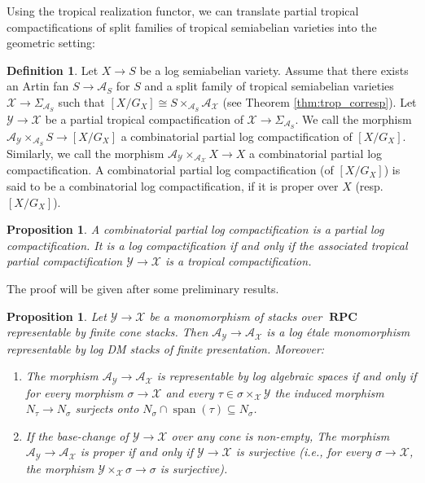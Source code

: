 \documentclass[11pt]{amsart}
\newtheorem{proposition}[theorem]{Proposition}
\theoremstyle{definition}
\newtheorem{definition}[theorem]{Definition}
\theoremstyle{remark}
\DeclareMathOperator{\Span}{span}
\DeclareMathOperator{\RPC}{\mathbf{RPC}}
\begin{document}
Using the tropical realization functor, we can translate partial tropical compactifications of split families of tropical semiabelian varieties
into the geometric setting:

\begin{definition}
	\label{def:combinat_prt_cpt}
	Let $X\to S$ be a log semiabelian variety. Assume that there exists an Artin fan $S\to \mathcal{A}_S$ for $S$ and
	a split family of tropical semiabelian varieties $\mathcal{X}\to \Sigma_{\mathcal{A}_S}$ such that
	$[X/G_X]\cong S\times_{\mathcal{A}_S}\mathcal{A}_{\mathcal{X}}$ (see Theorem \ref{thm:trop_corresp}). Let $\mathcal{Y}\to \mathcal{X}$
	be a partial tropical compactification of $\mathcal{X}\to \Sigma_{\mathcal{A}_S}$. We call the morphism
	$\mathcal{A}_{\mathcal{Y}}\times_{\mathcal{A}_{S}}S\to [X/G_X]$ a combinatorial partial log compactification of $[X/G_X]$.
	Similarly, we call the morphism $\mathcal{A}_{\mathcal{Y}}\times_{\mathcal{A}_{\mathcal{X}}}X\to X$
	a combinatorial partial log compactification. A combinatorial partial log compactification (of $[X/G_X]$) is said to be a combinatorial log compactification, if it is proper over $X$ (resp. $[X/G_X]$).
\end{definition}

\begin{proposition}
	\label{prop:combinat_cpt_is_cpt}
	A combinatorial partial log compactification is a partial
	log compactification. It is a log compactification
	if and only if the associated tropical partial compactification
	$\mathcal{Y}\to \mathcal{X}$ is a tropical compactification.
\end{proposition}

The proof will be given after some preliminary results.

\begin{proposition}
	\label{prop:mono_base_change}
	Let $\mathcal{Y}\to \mathcal{X}$ be a monomorphism of stacks over $\RPC$ representable by finite cone stacks.
	Then $\mathcal{A}_{\mathcal{Y}}\to \mathcal{A}_{\mathcal{X}}$ is a log étale monomorphism representable by
	log DM stacks of finite presentation. Moreover:
	\begin{enumerate}
		\item The morphism $\mathcal{A}_{\mathcal{Y}}\to \mathcal{A}_{\mathcal{X}}$ is representable by log
			algebraic spaces if and only if for every morphism $\sigma\to \mathcal{X}$ and every $\tau\in \sigma\times_{\mathcal{X}}\mathcal{Y}$
			the induced morphism $N_{\tau}\to N_{\sigma}$ surjects onto $N_{\sigma}\cap\Span(\tau)\subseteq N_{\sigma}$.
		\item If the base-change of $\mathcal{Y}\to \mathcal{X}$ over any cone is non-empty, The morphism $\mathcal{A}_{\mathcal{Y}}\to \mathcal{A}_{\mathcal{X}}$ is proper if and only if
			$\mathcal{Y}\to \mathcal{X}$ is surjective (i.e., for every $\sigma\to \mathcal{X}$, the morphism $\mathcal{Y}\times_{\mathcal{X}}\sigma\to \sigma$
			is surjective).
	\end{enumerate}
\end{proposition}
\end{document}
